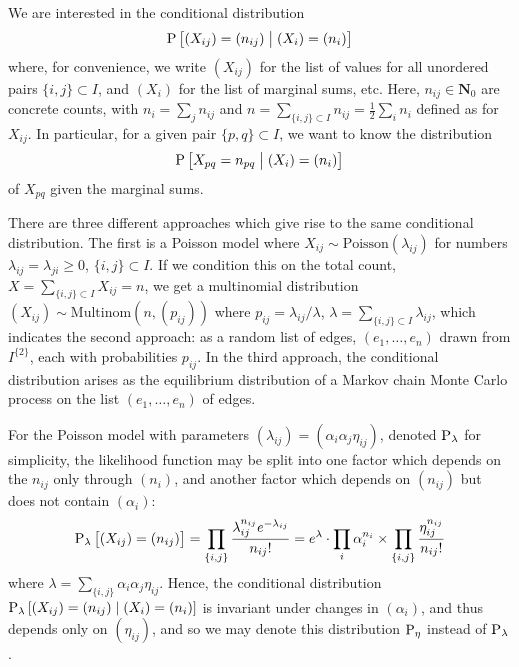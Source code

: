 \documentclass{myaptpub}%
\newcommand\NN{\mathbf{N}}
\newcommand\pair[1]{{#1^{\{2\}}}}
\newcommand\inpair[1]{\subset #1}
\newcommand\Prob{\sP}
\newcommand\ProbSub[1]{#1}
\newcommand\ProbDist[1]{\Prob_{\ProbSub{#1}}}
\newcommand\PR[1]{\Prob\left[#1\right]}
\newcommand\Prs[2]{\ProbDist{#1}\left[#2\right]}%
\newcommand\bigmid{\bigm|}
\begin{document}
We are interested in the conditional distribution
\begin{equation}\nonumber
\PR{(X_{ij})=(n_{ij})\bigmid (X_i)=(n_i)}
\end{equation}
where, for convenience, we write $(X_{ij})$ for the list of values for all unordered pairs $\{i,j\}\inpair{I}$, and $(X_i)$ for the list of marginal sums, etc. Here, $n_{ij}\in\NN_0$ are concrete counts, with $n_i=\sum_j n_{ij}$ and $n=\sum_{\{i,j\}\inpair{I}}n_{ij}=\frac{1}{2}\sum_i n_i$ defined as for $X_{ij}$. In particular, for a given pair $\{p,q\}\inpair{I}$, we want to know the distribution
\begin{equation}\nonumber
\PR{X_{pq}=n_{pq}\bigmid (X_i)=(n_i)}
\end{equation}
of $X_{pq}$ given the marginal sums.

There are three different approaches which give rise to the same conditional distribution. The first is a Poisson model where $X_{ij}\sim\textrm{Poisson}(\lambda_{ij})$ for numbers $\lambda_{ij}=\lambda_{ji}\ge0$, $\{i,j\}\inpair{I}$. If we condition this on the total count, $X=\sum_{\{i,j\}\inpair{I}}X_{ij}=n$, we get a multinomial distribution $(X_{ij})\sim\textrm{Multinom}(n,(p_{ij}))$ where $p_{ij}=\lambda_{ij}/\lambda$, $\lambda=\sum_{\{i,j\}\inpair{I}}\lambda_{ij}$, which indicates the second approach: as a random list of edges, $(e_1,\ldots,e_n)$ drawn from $\pair{I}$, each with probabilities $p_{ij}$. In the third approach, the conditional distribution arises as the equilibrium distribution of a Markov chain Monte Carlo process on the list $(e_1,\ldots,e_n)$ of edges.

For the Poisson model with parameters $(\lambda_{ij})=(\alpha_i\alpha_j\eta_{ij})$, denoted $\ProbDist{\lambda}$ for simplicity, the likelihood function may be split into one factor which depends on the $n_{ij}$ only through $(n_i)$, and another factor which depends on $(n_{ij})$ but does not contain $(\alpha_i)$:
\begin{equation}\nonumber
\Prs{\lambda}{\strut(X_{ij})=(n_{ij})}=\prod_{\{i,j\}}\frac{\lambda_{ij}^{n_{ij}}e^{-\lambda_{ij}}}{n_{ij}!}
=e^{\lambda}\cdot\prod_i\alpha_i^{n_i}\times\prod_{\{i,j\}}\frac{\eta_{ij}^{n_{ij}}}{n_{ij}!}
\end{equation}
where $\lambda=\sum_{\{i,j\}}\alpha_i\alpha_j\eta_{ij}$. Hence, the conditional distribution $\Prs{\lambda}{(X_{ij})=(n_{ij})\mid(X_i)=(n_i)}$ is invariant under changes in $(\alpha_i)$, and thus depends only on $(\eta_{ij})$, and so we may denote this distribution $\ProbDist{\eta}$ instead of $\ProbDist{\lambda}$.
\end{document}

